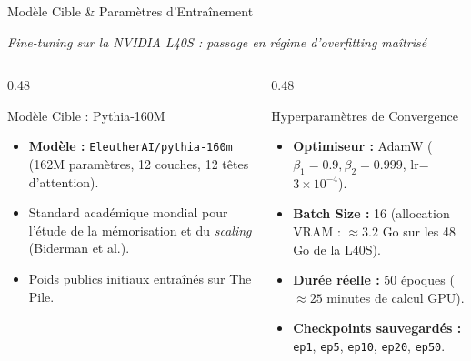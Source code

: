 \documentclass[aspectratio=169, 10pt, table]{beamer}
\newcommand{\subtitleline}[1]{{\small\itshape\color{TSPcyan}#1\par}\vspace{0.15cm}}
\begin{document}
\begin{frame}{Modèle Cible \& Paramètres d'Entraînement}
    \subtitleline{Fine-tuning sur la NVIDIA L40S : passage en régime d'overfitting maîtrisé}
    \begin{columns}[T]
        \begin{column}{0.48\textwidth}
            \begin{block}{Modèle Cible : Pythia-160M}
                \small
                \begin{itemize}
                    \item \textbf{Modèle :} \texttt{EleutherAI/pythia-160m} (162M paramètres, 12 couches, 12 têtes d'attention).
                    \item Standard académique mondial pour l'étude de la mémorisation et du \textit{scaling} (Biderman et al.).
                    \item Poids publics initiaux entraînés sur The Pile.
                \end{itemize}
            \end{block}
        \end{column}
        \begin{column}{0.48\textwidth}
            \begin{block}{Hyperparamètres de Convergence}
                \small
                \begin{itemize}
                    \item \textbf{Optimiseur :} AdamW ($\beta_1=0.9, \beta_2=0.999$, lr=$3\times 10^{-4}$).
                    \item \textbf{Batch Size :} 16 (allocation VRAM : $\approx 3.2$ Go sur les 48 Go de la L40S).
                    \item \textbf{Durée réelle :} 50 époques ($\approx 25$ minutes de calcul GPU).
                    \item \textbf{Checkpoints sauvegardés :} \texttt{ep1}, \texttt{ep5}, \texttt{ep10}, \texttt{ep20}, \texttt{ep50}.
                \end{itemize}
            \end{block}
        \end{column}
    \end{columns}
\end{frame}
\end{document}
